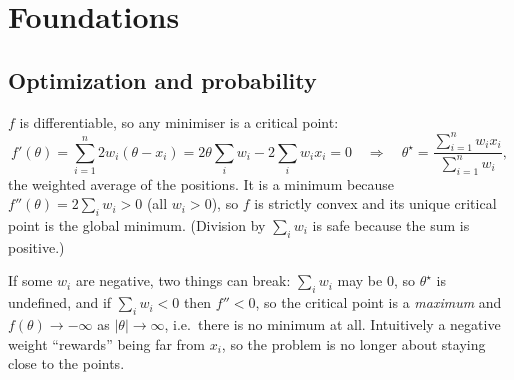 \section{Foundations}
\label{sec:foundations}

\subsection{Optimization and probability}

\begin{solution}
$f$ is differentiable, so any minimiser is a critical point:
\[
f'(\theta)=\sum_{i=1}^n 2w_i(\theta-x_i)=2\theta\sum_i w_i-2\sum_i w_ix_i=0
\quad\Longrightarrow\quad
\theta^\star=\frac{\sum_{i=1}^n w_i x_i}{\sum_{i=1}^n w_i},
\]
the weighted average of the positions. It is a minimum because
$f''(\theta)=2\sum_i w_i>0$ (all $w_i>0$), so $f$ is strictly convex and its unique critical point is the
global minimum. (Division by $\sum_i w_i$ is safe because the sum is positive.)

If some $w_i$ are negative, two things can break: $\sum_i w_i$ may be $0$, so $\theta^\star$ is undefined,
and if $\sum_i w_i<0$ then $f''<0$, so the critical point is a \emph{maximum} and $f(\theta)\to-\infty$ as
$|\theta|\to\infty$, i.e.\ there is no minimum at all. Intuitively a negative weight ``rewards'' being far from
$x_i$, so the problem is no longer about staying close to the points.
\end{solution}

